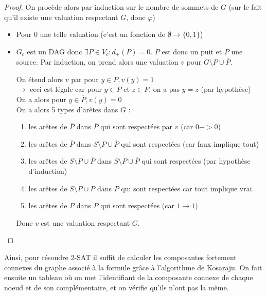 \begin{proof}
	On procède alors par induction sur le nombre de sommets de $G$ (sur le fait qu'il existe une valuation respectant $G$, donc $\varphi$)
	
	\begin{itemize}[label=$\star$]
		\item Pour $0$ une telle valuation (c'est un fonction de $\emptyset \to \{0,1\}$)
		\item $G_c$ est un DAG donc $\exists P \in V_c : d_+(P) = 0$. $P$ est donc un puit et $\overline P$ une source. Par induction, on prend alors une valuation $v$ pour $G\setminus P \cup \overline P$.
		
		On étend alors $v$ par pour $y \in P, v(y) = 1$\\
		\quad $\to$ ceci est légale car pour $y \in P$ et $z\in P$, on a pas $\overline y = z$ (par hypothèse)\\
		
		On a alors pour $y \in \overline P, v(y) = 0$\\
		
		On a alors 5 types d'arêtes dans $G$ : \begin{enumerate}
			\item les arêtes de $\overline P$ dans $\overline P$ qui sont respectées par $v$ (car $0->0$)
			\item les arêtes de $\overline P$ dans $S\setminus P \cup \overline P$ qui sont respectées (car faux implique tout)
			\item les arêtes de $S\setminus P \cup \overline P$ dans $S\setminus P \cup \overline P$ qui sont respectées (par hypothèse d'induction)
			\item les arêtes de $S\setminus P \cup \overline P$ dans $P$ qui sont respectées car tout implique vrai.
			\item les arêtes de $P$ dans $P$ qui sont respectées (car $1 \to 1$)
		\end{enumerate}
		Donc $v$ est une valuation respectant $G$.
	\end{itemize}
	
\end{proof}

Ainsi, pour résoudre 2-SAT il suffit de calculer les composantes fortement connexes du graphe associé à la formule grâce à l'algorithme de Kosaraju. On fait ensuite un tableau où on met l'identifiant de la composante connexe de chaque noeud et de son complémentaire, et on vérifie qu'ils n'ont pas la même.